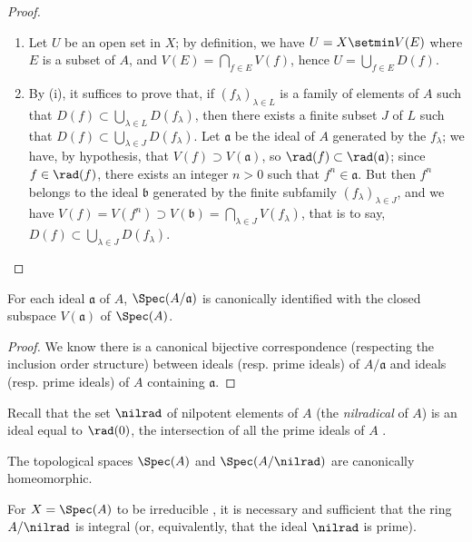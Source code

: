 \begin{proof}
\medskip\noindent
\begin{enumerate}
  \item[(i)] Let $U$ be an open set in $X$;
    by definition, we have $U=X\setmin V(E)$ where $E$ is a subset of $A$, and $V(E)=\bigcap_{f\in E}V(f)$, hence $U=\bigcup_{f\in E}D(f)$.
  \item[(ii)] By (i), it suffices to prove that, if $(f_\lambda)_{\lambda\in L}$ is a family of elements of $A$ such that $D(f)\subset\bigcup_{\lambda\in L}D(f_\lambda)$, then there exists a finite subset $J$ of $L$ such that $D(f)\subset\bigcup_{\lambda\in J}D(f_\lambda)$.
    Let $\mathfrak{a}$ be the ideal of $A$ generated by the $f_\lambda$;
    we have, by hypothesis, that $V(f)\supset V(\mathfrak{a})$, so $\rad(f)\subset\rad(\mathfrak{a})$;
    since $f\in\rad(f)$, there exists an integer $n>0$ such that $f^n\in\mathfrak{a}$.
    But then $f^n$ belongs to the ideal $\mathfrak{b}$ generated by the finite subfamily $(f_\lambda)_{\lambda\in J}$, and we have $V(f)=V(f^n)\supset V(\mathfrak{b})=\bigcap_{\lambda\in J}V(f_\lambda)$, that is to say, $D(f)\subset\bigcup_{\lambda\in J}D(f_\lambda)$.
\end{enumerate}
\end{proof}

\begin{proposition}[1.1.11]
\label{I.1.1.11}
For each ideal $\mathfrak{a}$ of $A$, $\Spec(A/\mathfrak{a})$ is canonically identified with the closed subspace $V(\mathfrak{a})$ of $\Spec(A)$.
\end{proposition}

\begin{proof}
We know there is a canonical bijective correspondence (respecting the inclusion order structure) between ideals (resp. prime ideals) of $A/\mathfrak{a}$ and ideals (resp. prime ideals) of $A$ containing $\mathfrak{a}$.
\end{proof}

Recall that the set $\nilrad$ of nilpotent elements of $A$ (the \emph{nilradical} of $A$) is an ideal equal to $\rad(0)$, the intersection of all the prime ideals of $A$ .

\begin{corollary}[1.1.12]
\label{I.1.1.12}
The topological spaces $\Spec(A)$ and $\Spec(A/\nilrad)$ are canonically homeomorphic.
\end{corollary}

\begin{proposition}[1.1.13]
\label{I.1.1.13}
For $X=\Spec(A)$ to be irreducible , it is necessary and sufficient that the ring $A/\nilrad$ is integral (or, equivalently, that the ideal $\nilrad$ is prime).
\end{proposition}

